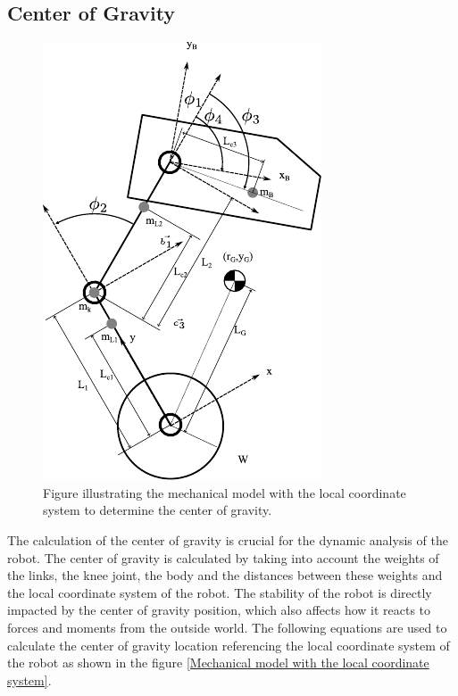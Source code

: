 \subsection{Center of Gravity }
%
%
%
%
	\begin{figure}[h]
		\centering
		\includegraphics[width=.5\textwidth]{Model}
		\caption[Mechanical model with the local coordinate system]{Figure illustrating the mechanical model with the local coordinate system to determine the center of gravity.}
		\label{fig:Mechanical model with the local coordinate system}
	\end{figure}

The calculation of the center of gravity is crucial for the dynamic analysis of the robot.
The center of gravity is calculated by taking into account the weights of the links, the knee joint, the body and the distances between these weights and the local coordinate system of the robot.
The stability of the robot is directly impacted by the center of gravity position, which also affects how it reacts to forces and moments from the outside world.
The following equations are used to calculate the center of gravity location referencing the local coordinate system of the robot as shown in the figure \ref{Mechanical model with the local coordinate system}.


